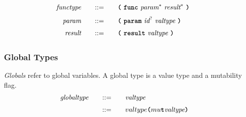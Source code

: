 \begin{alignat*}{9}
    && \textit{functype}    &&\quad ::= &\quad && \textbf{\texttt{(}}\ \textbf{\texttt{func}}\ \textit{param}^*\ \textit{result}^*\ \textbf{\texttt{)}}\  \quad && \\[1mm]
    && \textit{param}    &&\quad ::= &\quad && \textbf{\texttt{(}}\ \textbf{\texttt{param}}\ \textit{id}^?\ \textit{valtype}\ \textbf{\texttt{)}}\  \quad && \\[1mm]
    && \textit{result}    &&\quad ::= &\quad && \textbf{\texttt{(}}\ \textbf{\texttt{result}}\ \textit{valtype}\ \textbf{\texttt{)}}\  \quad && \\[1mm]
\end{alignat*}

\subsubsection{Global Types}
\textit{Globals} refer to global variables. A global type is a value type and a mutability flag.
\begin{alignat*}{9}
    && \textit{globaltype}    &&\quad ::= &\quad && \textit{valtype}  \quad && \\[1mm]
    &&     &&\quad ::= &\quad && valtype \textbf{\texttt{(}} mu\textbf{\texttt{t}} \textit{valtype} \textbf{\texttt{)}} \quad && \\[1mm]
\end{alignat*}
